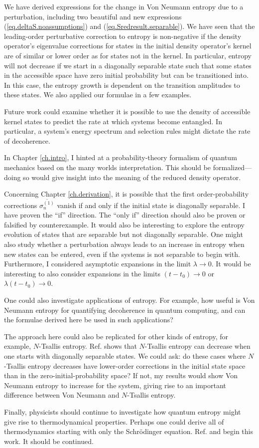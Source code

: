 We have derived expressions for the change in Von Neumann entropy due to a perturbation, including two beautiful and new expressions (\ref{eq.deltaS.noassumptions}) and (\ref{eq.Sredresult.separable}). We have seen that the leading-order perturbative correction to entropy is non-negative if the density operator's eigenvalue corrections for states in the initial density operator's kernel are of similar or lower order as for states not in the kernel. In particular, entropy will not decrease if we start in a diagonally separable state such that some states in the accessible space have zero initial probability but can be transitioned into. In this case, the entropy growth is dependent on the transition amplitudes to these states. We also applied our formulae in a few examples.

Future work could examine whether it is possible to use the density of accessible kernel states to predict the rate at which systems become entangled. In particular, a system’s energy spectrum and selection rules might dictate the rate of decoherence.

In Chapter \ref{ch.intro}, I hinted at a probability-theory formalism of quantum mechanics based on the many worlds interpretation. This should be formalized---doing so would give insight into the meaning of the reduced density operator.

Concerning Chapter \ref{ch.derivation}, it is possible that the first order-probability corrections \(\overline{\sigma_n^{(1)}}\) vanish if and only if the initial state is diagonally separable. I have proven the ``if'' direction. The ``only if'' direction should also be proven or falsified by counterexample. It would also be interesting to explore the entropy evolution of states that are separable but not diagonally separable. One might also study whether a perturbation always leads to an increase in entropy when new states can be entered, even if the systems is not separable to begin with. Furthermore, I considered asymptotic expansions in the limit \(\lambda \to 0\). It would be interesting to also consider expansions in the limits \(\left(t-t_0\right) \to 0\) or \(\lambda\left(t-t_0\right) \to 0\).

One could also investigate applications of entropy. For example, how useful is Von Neumann entropy for quantifying decoherence in quantum computing, and can the formulae derived here be used in such applications? 

The approach here could also be replicated for other kinds of entropy, for example, \(N\)-Tsallis entropy. Ref. \cite{cheung} shows that \(N\)-Tsallis entropy can decrease when one starts with diagonally separable states. We could ask: do these cases where \(N\)-Tsallis entropy decreases have lower-order corrections in the initial state space than in the zero-initial-probability space? If not, my results would show Von Neumann entropy to increase for the system, giving rise to an important difference between Von Neumann and \(N\)-Tsallis entropy.

Finally, physicists should continue to investigate how quantum entropy might give rise to thermodynamical properties. Perhaps one could derive all of thermodynamics starting with only the Schrödinger equation. Ref. \cite{bracken} and \cite{heusler} begin this work. It should be continued.
